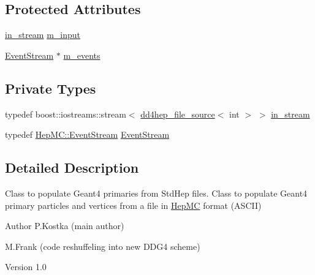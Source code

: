 \subsection*{Protected Attributes}
\begin{DoxyCompactItemize}
\item 
\hyperlink{class_d_d4hep_1_1_simulation_1_1_geant4_event_reader_hep_m_c_a1a456562e141e47288810fb708fa3815}{in\_\-stream} \hyperlink{class_d_d4hep_1_1_simulation_1_1_geant4_event_reader_hep_m_c_ab5768f9462667c171c87dbb0ce830e36}{m\_\-input}
\item 
\hyperlink{class_d_d4hep_1_1_simulation_1_1_hep_m_c_1_1_event_stream}{EventStream} $\ast$ \hyperlink{class_d_d4hep_1_1_simulation_1_1_geant4_event_reader_hep_m_c_a0e1d85baaaec0af5a18bb63ec3cdd20a}{m\_\-events}
\end{DoxyCompactItemize}
\subsection*{Private Types}
\begin{DoxyCompactItemize}
\item 
typedef boost::iostreams::stream$<$ \hyperlink{class_d_d4hep_1_1dd4hep__file__source}{dd4hep\_\-file\_\-source}$<$ int $>$ $>$ \hyperlink{class_d_d4hep_1_1_simulation_1_1_geant4_event_reader_hep_m_c_a1a456562e141e47288810fb708fa3815}{in\_\-stream}
\item 
typedef \hyperlink{class_d_d4hep_1_1_simulation_1_1_hep_m_c_1_1_event_stream}{HepMC::EventStream} \hyperlink{class_d_d4hep_1_1_simulation_1_1_geant4_event_reader_hep_m_c_a260380eb48d2adb971aaade903a47da8}{EventStream}
\end{DoxyCompactItemize}


\subsection{Detailed Description}
Class to populate Geant4 primaries from StdHep files. Class to populate Geant4 primary particles and vertices from a file in \hyperlink{namespace_d_d4hep_1_1_simulation_1_1_hep_m_c}{HepMC} format (ASCII)

\begin{DoxyAuthor}{Author}
P.Kostka (main author) 

M.Frank (code reshuffeling into new DDG4 scheme) 
\end{DoxyAuthor}
\begin{DoxyVersion}{Version}
1.0 
\end{DoxyVersion}


